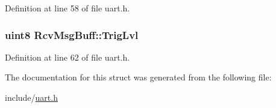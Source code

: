 Definition at line 58 of file uart.\-h.

\hypertarget{structRcvMsgBuff_a142735d44b7fefc09c930d58b5e70d4d}{
\subsubsection[{Trig\-Lvl}]{\setlength{\rightskip}{0pt plus 5cm}uint8 Rcv\-Msg\-Buff\-::\-Trig\-Lvl}}\label{structRcvMsgBuff_a142735d44b7fefc09c930d58b5e70d4d}


Definition at line 62 of file uart.\-h.



The documentation for this struct was generated from the following file\-:\begin{DoxyCompactItemize}
\item 
include/\hyperlink{uart_8h}{uart.\-h}\end{DoxyCompactItemize}
